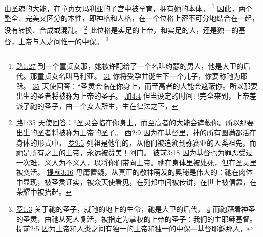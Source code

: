 \documentclass[12pt, a4paper, oneside]{ctexart}
\begin{document}
	由圣魂的大能，在童贞女玛利亚的子宫中被孕育，拥有她的本体。
	\footnote {
		\href{https://biblehub.com/luke/1-27.htm}{路1:27} 到一个童贞女那，她被许配给了一个名叫约瑟的男人，他是大卫的后代。那童贞女名叫马利亚。
		\href{https://biblehub.com/luke/1-31.htm}{31} 你将受孕并诞生下一个儿子，你要称祂为耶稣。
		\href{https://biblehub.com/luke/1-35.htm}{35} 天使回答：“圣灵会临在你身上，而至高者的大能会遮蔽你。所以那要出生的圣者将被称为上帝的圣子。
		\href{https://biblehub.com/galatians/4-4.htm}{加4:4} 但当设定的时间已完全来到，上帝差派了祂的圣子，由一个女人所生，生在律法之下，
	}
	因此，两个整全、完美又区分的本性，即神格和人格，在一个位格上密不可分地结合在一起，没有转换、合成或混乱。
	\footnote {
		\href{https://biblehub.com/luke/1-35.htm}{路1:35} 天使回答：“圣灵会临在你身上，而至高者的大能会遮蔽你。所以那要出生的圣者将被称为上帝的圣子。
		\href{https://biblehub.com/colossians/2-9.htm}{西2:9} 因为在基督里，神的所有圆满都活在身体的形式中，
		\href{https://biblehub.com/romans/9-5.htm}{罗9:5} 列祖是他们的，从他们被追溯到弥赛亚的人类祖先，而祂是所有之上的上帝，永远被赞美！阿门。
		\href{https://biblehub.com/1_peter/3-18.htm}{彼前3:18} 因为基督也为罪恶受过一次难，义人为不义人，以将你们带向上帝。祂在身体里被处死，但在圣灵里被变活。
		\href{https://biblehub.com/1_timothy/3-16.htm}{提前3:16} 毋庸置疑，从真正的敬神萌发的奥秘是伟大的：祂在肉体中显现，被圣灵证实，被众天使看见，在列邦中间被传讲，在世上被信靠，在荣耀中被抬起。
	}
	此位格是实足的上帝，和实足的人，还是独一的基督，上帝与人之间惟一的中保。
	\footnote {
		\href{https://biblehub.com/romans/1-3.htm}{罗1:3} 关于祂的圣子，就祂的地上的生命，祂是大卫的后代，
		\href{https://biblehub.com/romans/1-4.htm}{4} 而祂藉着神圣的圣灵，由祂从死人复活，被指定为掌权的上帝的圣子：我们的主耶稣基督。
		\href{https://biblehub.com/1_timothy/2-5.htm}{提前2:5} 因为上帝和人类之间有独一的上帝和独一的中保---基督耶稣那人，
	}
\end{document}
